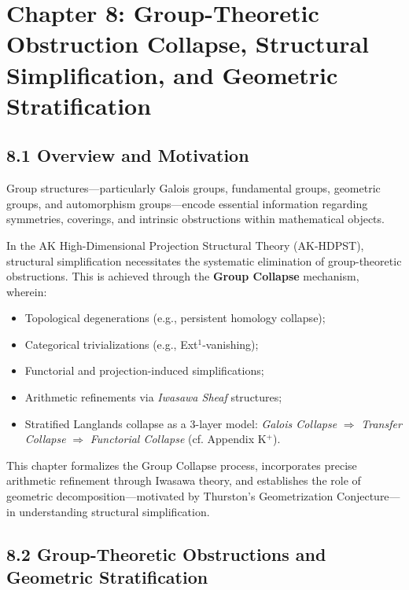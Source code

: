 \documentclass[11pt]{article}
\begin{document}
\section{Chapter 8: Group-Theoretic Obstruction Collapse, Structural Simplification, and Geometric Stratification}

\subsection*{8.1 Overview and Motivation}

Group structures—particularly Galois groups, fundamental groups, geometric groups, and automorphism groups—encode essential information regarding symmetries, coverings, and intrinsic obstructions within mathematical objects.

In the AK High-Dimensional Projection Structural Theory (AK-HDPST), structural simplification necessitates the systematic elimination of group-theoretic obstructions. This is achieved through the \textbf{Group Collapse} mechanism, wherein:

\begin{itemize}
    \item Topological degenerations (e.g., persistent homology collapse);
    \item Categorical trivializations (e.g., Ext$^1$-vanishing);
    \item Functorial and projection-induced simplifications;
    \item Arithmetic refinements via \emph{Iwasawa Sheaf} structures;
    \item Stratified Langlands collapse as a 3-layer model: \emph{Galois Collapse} $\Rightarrow$ \emph{Transfer Collapse} $\Rightarrow$ \emph{Functorial Collapse} (cf. Appendix K$^+$).
\end{itemize}

This chapter formalizes the Group Collapse process, incorporates precise arithmetic refinement through Iwasawa theory, and establishes the role of geometric decomposition—motivated by Thurston's Geometrization Conjecture—in understanding structural simplification.

\subsection*{8.2 Group-Theoretic Obstructions and Geometric Stratification}
\end{document}
